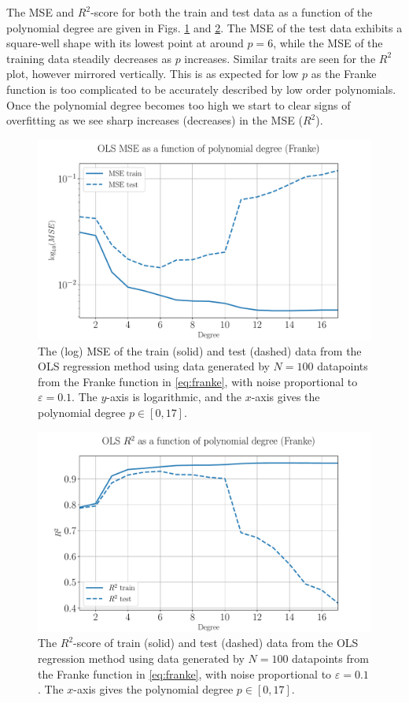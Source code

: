 \documentclass[%
reprint,
amsmath,amssymb,
aps,
pra,
]{revtex4-2}
\begin{document}
The MSE and $R^2$-score for both the train and test data as a function of the polynomial degree are given in Figs. \ref{fig:OLS_mse_degree} and \ref{fig:OLS_r2_degree}. The MSE of the test data exhibits a square-well shape with its lowest point at around \(p=6\), while the MSE of the training data steadily decreases as \(p\) increases. Similar traits are seen for the $R^2$ plot, however mirrored vertically. This is as expected for low $p$ as the Franke function is too complicated to be accurately described by low order polynomials. Once the polynomial degree becomes too high we start to clear signs of overfitting as we see sharp increases (decreases) in the MSE ($R^2$). 
\begin{figure}[ht!]
	\centering
	\includegraphics[width=\linewidth]{Python/Figures/OLS/OLS_MSE_Unscaled.pdf}
	\caption{The (log) MSE of the train (solid) and test (dashed) data from the OLS regression method using data generated by \(N=100\) datapoints from the Franke function in \eqref{eq:franke}, with noise proportional to \(\varepsilon=0.1\). The $y$-axis is logarithmic, and the $x$-axis gives the polynomial degree \(p\in[0,17]\).}
	\label{fig:OLS_mse_degree}
\end{figure}
\begin{figure}[ht!]
	\centering
	\includegraphics[width=\linewidth]{Python/Figures/OLS/OLS_R2_Unscaled.pdf}
	\caption{The \(R^2\)-score of train (solid) and test (dashed) data from the OLS regression method using data generated by \(N=100\) datapoints from the Franke function in \eqref{eq:franke}, with noise proportional to \(\varepsilon=0.1\). The $x$-axis gives the polynomial degree \(p\in[0,17]\).}
	\label{fig:OLS_r2_degree}
\end{figure}
\end{document}
